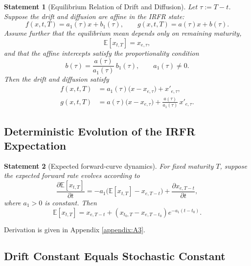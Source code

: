 \documentclass[12pt]{article}
\theoremstyle{statementstyle}
\newtheorem{statement}{Statement}[section]
\begin{document}
\begin{statement}[Equilibrium Relation of Drift and Diffusion]
\label{stmt:eqrelation}
\emph{
Let \(\tau:=T-t\). Suppose the drift and diffusion are affine in the IRFR state:
}
\[
f(x,t,T)=a_1(\tau)x+b_1(\tau),\qquad
g(x,t,T)=a(\tau)x+b(\tau).
\]
\emph{
Assume further that the equilibrium mean depends only on remaining maturity,
}
\[
\mathbb{E}[x_{t,T}]=x_{e,\tau},
\]
\emph{
and that the affine intercepts satisfy the proportionality condition
}
\[
b(\tau)=\frac{a(\tau)}{a_1(\tau)}\,b_1(\tau),
\qquad a_1(\tau)\neq 0.
\]
\emph{
Then the drift and diffusion satisfy
}
\begin{align}
f(x,t,T)
&=
a_1(\tau)\bigl(x-x_{e,\tau}\bigr)+x'_{e,\tau},
\tag{3.2.1a}\label{eq:eqdrift}\\[0.3em]
g(x,t,T)
&=
a(\tau)\bigl(x-x_{e,\tau}\bigr)
+
\frac{a(\tau)}{a_1(\tau)}\,x'_{e,\tau}.
\tag{3.2.1b}\label{eq:eqdiffusion}
\end{align}
\end{statement}
\subsection{Deterministic Evolution of the IRFR Expectation}

\begin{statement}[Expected forward-curve dynamics]\label{stmt:expectation}
\normalfont
For fixed maturity \(T\), suppose the expected forward rate evolves according to
\[
\frac{\partial \mathbb{E}[x_{t,T}]}{\partial t}
=
-a_1\bigl(\mathbb{E}[x_{t,T}] - x_{e,T-t}\bigr)
+
\frac{\partial x_{e,T-t}}{\partial t},
\]
where \(a_1>0\) is constant. Then
\begin{equation}
\mathbb{E}[x_{t,T}]
=
x_{e,T-t}
+
\left(x_{t_0,T}-x_{e,T-t_0}\right)e^{-a_1(t-t_0)}.
\tag{3.3.1}\label{eq:expectation-general}
\end{equation}
\end{statement}

Derivation is given in Appendix \ref{appendix:A3}.

\subsection{Drift Constant Equals Stochastic Constant}
\end{document}
